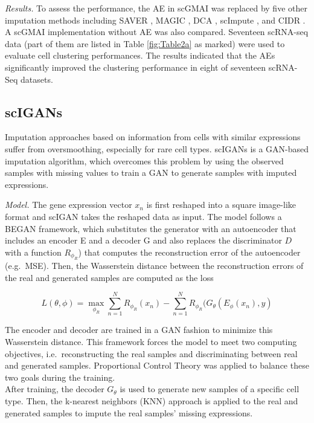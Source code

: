 \documentclass[
]{book}
\begin{document}
\emph{Results.} To assess the performance, the AE in scGMAI was replaced by five other imputation methods including SAVER \citep{RN30}, MAGIC \citep{RN111}, DCA \citep{RN80}, scImpute \citep{RN31}, and CIDR \citep{RN113}. A scGMAI implementation without AE was also compared. Seventeen scRNA-seq data (part of them are listed in Table \ref{fig:Table2a} as marked) were used to evaluate cell clustering performances. The results indicated that the AEs significantly improved the clustering performance in eight of seventeen scRNA-Seq datasets.

\hypertarget{ch-5-1-6}{%
\subsection{scIGANs}\label{ch-5-1-6}}

Imputation approaches based on information from cells with similar expressions suffer from oversmoothing, especially for rare cell types. scIGANs \citep{RN102} is a GAN-based imputation algorithm, which overcomes this problem by using the observed samples with missing values to train a GAN to generate samples with imputed expressions.

\emph{Model.} The gene expression vector \(x_{n}\) is first reshaped into a square image-like format and scIGAN takes the reshaped data as input. The model follows a BEGAN \citep{RN116} framework, which substitutes the generator with an autoencoder that includes an encoder E and a decoder G and also replaces the discriminator \(D\) with a function \(R_{\phi_{R}}\)) that computes the reconstruction error of the autoencoder (e.g.~MSE). Then, the Wasserstein distance between the reconstruction errors of the real and generated samples are computed as the loss

\begin{equation}
L(\theta,\phi) = \max_{\phi_{R}}\sum_{n=1}^{N}R_{\phi_{R}}(x_{n})-\sum_{n=1}^{N}R_{\phi_{R}}(G_{\theta}(E_{\phi}(x_{n}),y) \label{eq:eq16}
\end{equation}

The encoder and decoder are trained in a GAN fashion to minimize this Wasserstein distance. This framework forces the model to meet two computing objectives, i.e.~reconstructing the real samples and discriminating between real and generated samples. Proportional Control Theory was applied to balance these two goals during the training.\\
After training, the decoder \(G_{\theta}\) is used to generate new samples of a specific cell type. Then, the k-nearest neighbors (KNN) approach is applied to the real and generated samples to impute the real samples' missing expressions.
\end{document}
